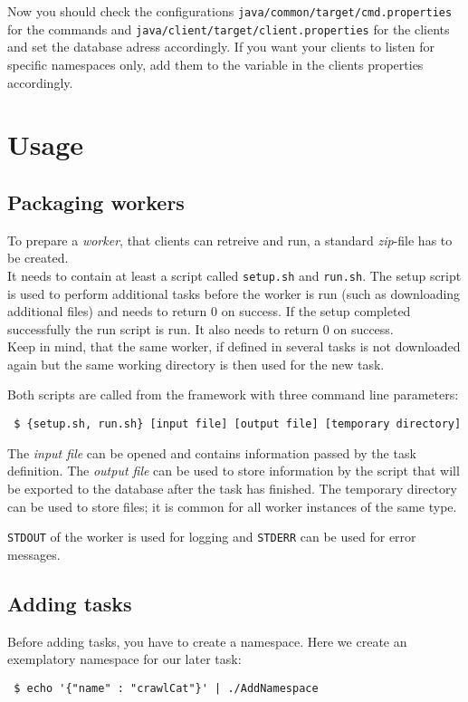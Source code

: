 \documentclass[a4paper,11pt]{article}
\begin{document}
Now you should check the configurations \texttt{java/common/target/cmd.properties} for the commands and \texttt{java/client/target/client.properties} for the clients and set the database adress accordingly. If you want your clients to listen for specific namespaces only, add them to the variable in the clients properties accordingly.

\section{Usage}

\subsection{Packaging workers\label{sec:workers}}
To prepare a \textit{worker}, that clients can retreive and run, a standard \textit{zip}-file has to be created.\\
It needs to contain at least a script called \texttt{setup.sh} and \texttt{run.sh}. The setup script is used to perform additional tasks before the worker is run (such as downloading additional files) and needs to return 0 on success. If the setup completed successfully the run script is run. It also needs to return 0 on success.\\
Keep in mind, that the same worker, if defined in several tasks is not downloaded again but the same working directory is then used for the new task.

Both scripts are called from the framework with three command line parameters:
\begin{verbatim}
 $ {setup.sh, run.sh} [input file] [output file] [temporary directory]
\end{verbatim}

The \textit{input file} can be opened and contains information passed by the task definition. The \textit{output file} can be used to store information by the script that will be exported to the database after the task has finished. The temporary directory can be used to store files; it is common for all worker instances of the same type.

\texttt{STDOUT} of the worker is used for logging and \texttt{STDERR} can be used for error messages.

\subsection{Adding tasks}
Before adding tasks, you have to create a namespace. Here we create an exemplatory namespace for our later task:
\begin{verbatim}
 $ echo '{"name" : "crawlCat"}' | ./AddNamespace
\end{verbatim}
\end{document}
